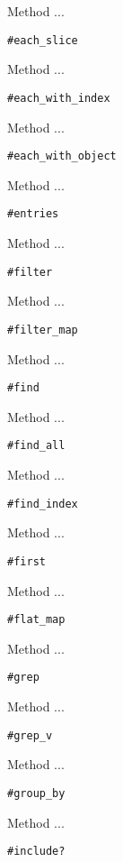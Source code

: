 Method ...
\begin{verbatim}
#each_slice
\end{verbatim}

Method ...
\begin{verbatim}
#each_with_index
\end{verbatim}

Method ...
\begin{verbatim}
#each_with_object
\end{verbatim}

Method ...
\begin{verbatim}
#entries
\end{verbatim}

Method ...
\begin{verbatim}
#filter
\end{verbatim}

Method ...
\begin{verbatim}
#filter_map
\end{verbatim}

Method ...
\begin{verbatim}
#find
\end{verbatim}

Method ...
\begin{verbatim}
#find_all
\end{verbatim}

Method ...
\begin{verbatim}
#find_index
\end{verbatim}

Method ...
\begin{verbatim}
#first
\end{verbatim}

Method ...
\begin{verbatim}
#flat_map
\end{verbatim}

Method ...
\begin{verbatim}
#grep
\end{verbatim}

Method ...
\begin{verbatim}
#grep_v
\end{verbatim}

Method ...
\begin{verbatim}
#group_by
\end{verbatim}

Method ...
\begin{verbatim}
#include?
\end{verbatim}


